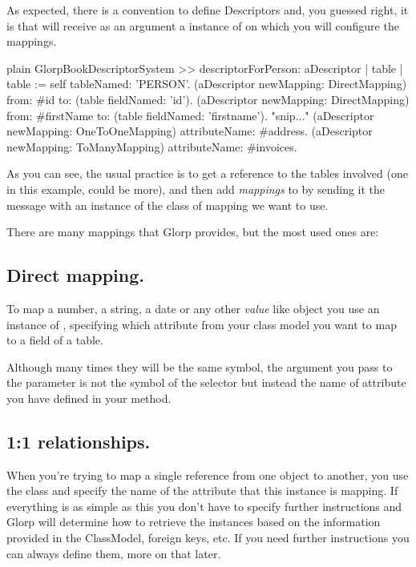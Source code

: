 \documentclass[10pt,twoside,english]{_support/latex/sbabook/sbabook}
\begin{document}
As expected, there is a convention to define Descriptors and, you guessed right,
it is  that will receive as an argument a
instance of  on which you will configure the mappings.

\begin{displaycode}{plain}
GlorpBookDescriptorSystem >> descriptorForPerson: aDescriptor
	| table |
	table := self tableNamed: 'PERSON'.
	(aDescriptor newMapping: DirectMapping) from: #id to: (table fieldNamed: 'id').
	(aDescriptor newMapping: DirectMapping) from: #firstName to: (table fieldNamed: 'firstname').
	"snip..."
	(aDescriptor newMapping: OneToOneMapping) attributeName: #address.
	(aDescriptor newMapping: ToManyMapping) attributeName: #invoices.
\end{displaycode}

As you can see, the usual practice is to get a reference to the tables involved
(one in this example, could be more), and then add \textit{mappings} to
 by sending it the message  with an instance of
the class of mapping we want to use.

There are many mappings that Glorp provides, but the most used ones are:
\subsection{Direct mapping.}
To map a number, a string, a date or any other \textit{value} like object
you use an instance of , specifying which attribute from
your class model you want to map to a field of a table.

Although many times they will be the same symbol, the argument you pass to
the  parameter is not the symbol of the selector
but instead the name of attribute you have defined in your 
method.
\subsection{1:1 relationships.}
When you're trying to map a single reference from one object to another,
you use the class  and specify the name of the attribute
that this instance is mapping. If everything is as simple as this you don't
have to specify further instructions and Glorp will determine how to retrieve
the instances based on the information provided in the ClassModel, foreign keys,
etc. If you need further instructions you can always define them, more on that later.
\end{document}
